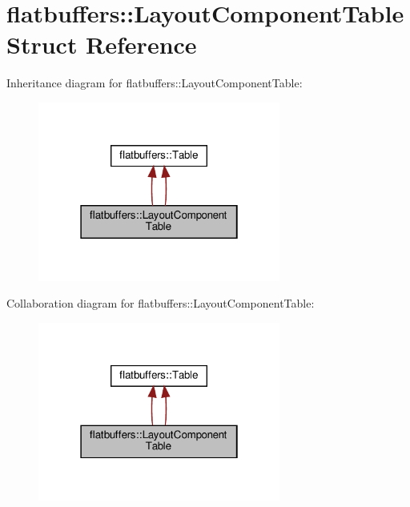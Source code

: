 \hypertarget{structflatbuffers_1_1LayoutComponentTable}{}\section{flatbuffers\+:\+:Layout\+Component\+Table Struct Reference}
\label{structflatbuffers_1_1LayoutComponentTable}


Inheritance diagram for flatbuffers\+:\+:Layout\+Component\+Table\+:
\nopagebreak
\begin{figure}[H]
\begin{center}
\leavevmode
\includegraphics[width=226pt]{structflatbuffers_1_1LayoutComponentTable__inherit__graph}
\end{center}
\end{figure}


Collaboration diagram for flatbuffers\+:\+:Layout\+Component\+Table\+:
\nopagebreak
\begin{figure}[H]
\begin{center}
\leavevmode
\includegraphics[width=226pt]{structflatbuffers_1_1LayoutComponentTable__coll__graph}
\end{center}
\end{figure}
